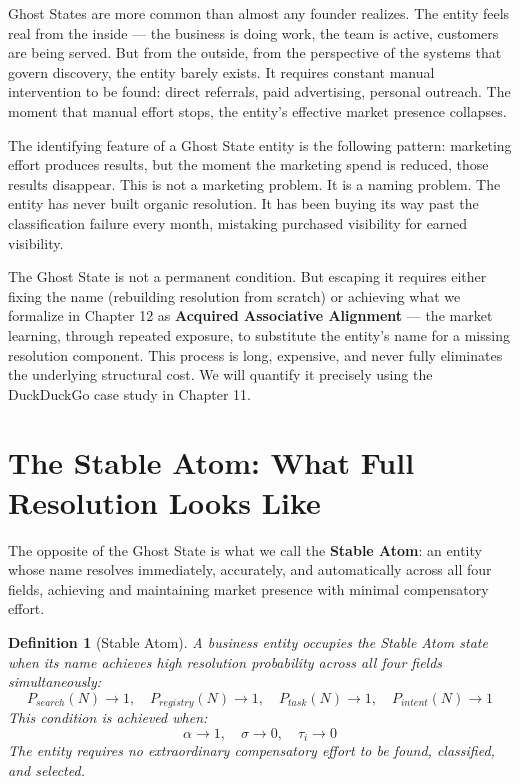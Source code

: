 \documentclass[12pt, openany]{book}
\theoremstyle{thmstyle}
\theoremstyle{defstyle}
\newtheorem{definition}{Definition}[chapter]
\begin{document}
Ghost States are more common than almost any founder realizes. The entity feels real from the inside --- the business is doing work, the team is active, customers are being served. But from the outside, from the perspective of the systems that govern discovery, the entity barely exists. It requires constant manual intervention to be found: direct referrals, paid advertising, personal outreach. The moment that manual effort stops, the entity's effective market presence collapses.

\vspace{8pt}

The identifying feature of a Ghost State entity is the following pattern: marketing effort produces results, but the moment the marketing spend is reduced, those results disappear. This is not a marketing problem. It is a naming problem. The entity has never built organic resolution. It has been buying its way past the classification failure every month, mistaking purchased visibility for earned visibility.

\vspace{8pt}

The Ghost State is not a permanent condition. But escaping it requires either fixing the name (rebuilding resolution from scratch) or achieving what we formalize in Chapter 12 as \textbf{Acquired Associative Alignment} --- the market learning, through repeated exposure, to substitute the entity's name for a missing resolution component. This process is long, expensive, and never fully eliminates the underlying structural cost. We will quantify it precisely using the DuckDuckGo case study in Chapter 11.

\section{The Stable Atom: What Full Resolution Looks Like}

The opposite of the Ghost State is what we call the \textbf{Stable Atom}: an entity whose name resolves immediately, accurately, and automatically across all four fields, achieving and maintaining market presence with minimal compensatory effort.

\begin{definition}[Stable Atom]
A business entity occupies the Stable Atom state when its name achieves high resolution probability across all four fields simultaneously:
\[
P_{search}(N) \to 1, \quad P_{registry}(N) \to 1, \quad P_{task}(N) \to 1, \quad P_{intent}(N) \to 1
\]
This condition is achieved when:
\[
\alpha \to 1, \quad \sigma \to 0, \quad \tau_i \to 0
\]
The entity requires no extraordinary compensatory effort to be found, classified, and selected.
\end{definition}
\end{document}
